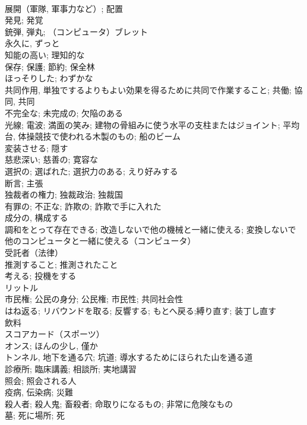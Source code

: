 \documentclass[8pt]{extreport}
\begin{document}
\begin{CJK}{UTF8}{min}
\\	展開（軍隊, 軍事力など）; 配置	
\\	発見; 発覚	
\\	銃弾, 弾丸; （コンピュータ）ブレット	
\\	永久に, ずっと	
\\	知能の高い; 理知的な	
\\	保存; 保護; 節約; 保全林	
\\	ほっそりした; わずかな	
\\	共同作用, 単独でするよりもよい効果を得るために共同で作業すること; 共働; 協同, 共同	
\\	不完全な; 未完成の; 欠陥のある	
\\	光線; 電波; 満面の笑み; 建物の骨組みに使う水平の支柱またはジョイント; 平均台, 体操競技で使われる木製のもの; 船のビーム	
\\	変装させる; 隠す	
\\	慈悲深い; 慈善の; 寛容な	
\\	選択の; 選ばれた; 選択力のある; えり好みする	
\\	断言; 主張	
\\	独裁者の権力; 独裁政治; 独裁国	
\\	有罪の; 不正な; 詐欺の; 詐欺で手に入れた	
\\	成分の, 構成する	
\\	調和をとって存在できる; 改造しないで他の機械と一緒に使える; 変換しないで他のコンピュータと一緒に使える（コンピュータ）	
\\	受託者（法律）
\\	推測すること; 推測されたこと	
\\	考える; 投機をする	
\\	リットル	
\\	市民権; 公民の身分; 公民権; 市民性; 共同社会性	
\\	はね返る; リバウンドを取る; 反響する; もとへ戻る;縛り直す; 装丁し直す	
\\	飲料	
\\	スコアカード（スポーツ）	
\\	オンス; ほんの少し, 僅か	
\\	トンネル, 地下を通る穴; 坑道; 導水するためにほられた山を通る道	
\\	診療所; 臨床講義; 相談所; 実地講習	
\\	照会; 照会される人	
\\	疫病, 伝染病; 災難	
\\	殺人者; 殺人鬼; 畜殺者; 命取りになるもの; 非常に危険なもの	
\\	墓; 死に場所; 死	

\end{CJK}
\end{document}
